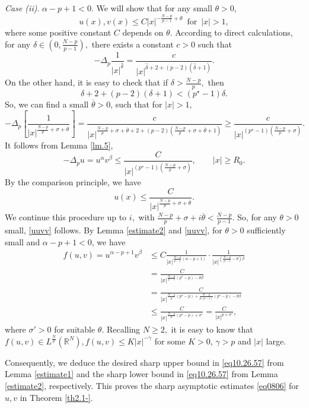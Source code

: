 \documentclass[12pt]{amsart}
\theoremstyle{definition}
\theoremstyle{remark}
\theoremstyle{conclusion}
\theoremstyle{conjecture}
\numberwithin{equation}{section}
\newcommand{\R}{\mathbb{R}}
\begin{document}
\emph{Case (ii)}. $\alpha-p+1<0.$ We will show that for any small $\theta>0$,
\begin{equation}\label{uuvv}
u(x),v(x)\leq C|x|^{-\frac{N-p}{p-1}+\theta} \,\,\,\mbox{for}\,\,\,|x|>1,
\end{equation}
where some positive constant $C$ depends on $\theta$.
According to direct calculations, for any $\hat{\delta} \in (0, \frac{N-p}{p-1}),$ there exists a constant $c>0$ such that
$$-\Delta_p \frac{1}{|x|^{\hat{\delta}}}=\frac{c}{|x|^{\hat{\delta}+2+(p-2)(\hat{\delta}+1)}}.$$
On the other hand, it is easy to check that if $\delta>\frac{N-p}{p},$ then
$$\delta+2+(p-2)(\delta+1)<(p^\star-1)\delta.$$
So, we can find a small $\overline{\theta}>0$, such that for $|x|>1,$
$$-\Delta_p \left[\frac{1}{|x|^{\frac{N-p}{p}+\sigma+\overline{\theta}}}\right]=\frac{c}{|x|^{\frac{N-p}{p}+\sigma+\overline{\theta}+2+(p-2)(\frac{N-p}{p}+\sigma+\overline{\theta}+1)}}\geq\frac{c}{|x|^{(p^\star-1)(\frac{N-p}{p}+\sigma)}}.$$
It follows from Lemma \ref{lm.5},
$$-\Delta_p u=u^\alpha v^\beta \leq \frac{C}{|x|^{(p^\star-1)(\frac{N-p}{p}+\sigma)}}, \qquad |x|\geq R_0.$$
By the comparison principle, we have
$$u(x)\leq \frac{C}{|x|^{\frac{N-p}{p}+\sigma+\overline{\theta}}}.$$
We continue this procedure up to $i,$ with $\frac{N-p}{p}+\sigma+i\overline{\theta}<\frac{N-p}{p-1}.$ So, for any $\theta >0$ small,
\eqref{uuvv} follows.
By Lemma \ref{estimate2} and \eqref{uuvv}, for $\theta >0$ sufficiently small and $\alpha-p+1<0$, we have
\begin{align*}
    f(u,v)=u^{\alpha-p+1}v^\beta &\leq C\frac{1}{|x|^{\frac{N-p}{p-1}(\alpha-p+1)}} \cdot \frac{1}{|x|^{(\frac{N-p}{p-1}-\theta)\beta}}\\
    &=\frac{C}{|x|^{\frac{N-p}{p-1}(p^\star-p)-\theta \beta}}\\
    &=\frac{C}{|x|^{\frac{N-p}{p}(p^\star-p)+\frac{N-p}{p(p-1)}(p^\star-p)-\theta \beta}}\\
    &\leq \frac{C}{|x|^{\frac{N-p}{p}(p^\star-p)+\sigma'}}=\frac{C}{|x|^{p+\sigma'}},
\end{align*}
where $\sigma'>0$ for suitable $\theta$. Recalling $N\geq 2,$ it is easy to know that $f(u,v)\in L^\frac{N}{p}(\R^N), f(u,v)\leq K|x|^{-\gamma}$ for some $K>0$, $\gamma>p$ and $|x|$ large.

Consequently, we deduce the desired sharp upper bound in \eqref{eq10.26.57} from Lemma \ref{estimate1} and the sharp lower bound in \eqref{eq10.26.57} from Lemma \ref{estimate2}, respectively. This proves the sharp asymptotic estimates \eqref{eq0806} for $u,v$ in Theorem \ref{th2.1-}.
\end{document}
